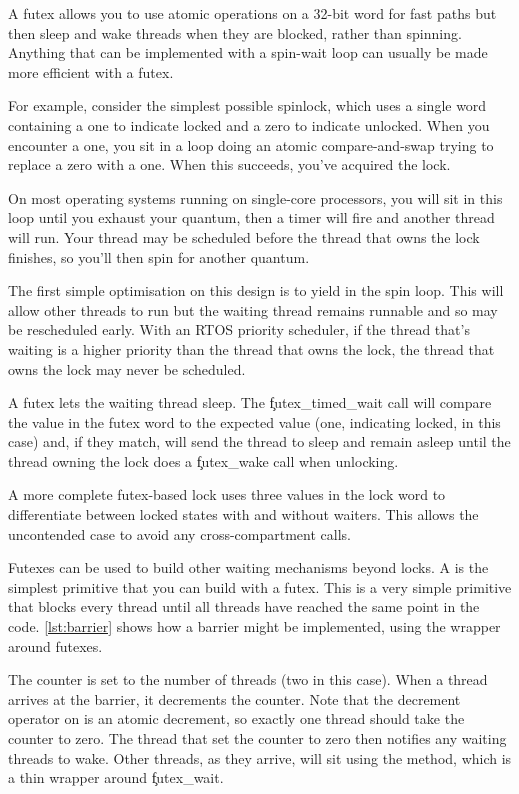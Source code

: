 A futex allows you to use atomic operations on a 32-bit word for fast paths but then sleep and wake threads when they are blocked, rather than spinning.
Anything that can be implemented with a spin-wait loop can usually be made more efficient with a futex.

For example, consider the simplest possible spinlock, which uses a single word containing a one to indicate locked and a zero to indicate unlocked.
When you encounter a one, you sit in a loop doing an atomic compare-and-swap trying to replace a zero with a one.
When this succeeds, you've acquired the lock.

On most operating systems running on single-core processors, you will sit in this loop until you exhaust your quantum, then a timer will fire and another thread will run.
Your thread may be scheduled before the thread that owns the lock finishes, so you'll then spin for another quantum.

The first simple optimisation on this design is to yield in the spin loop.
This will allow other threads to run but the waiting thread remains runnable and so may be rescheduled early.
With an RTOS priority scheduler, if the thread that's waiting is a higher priority than the thread that owns the lock, the thread that owns the lock may never be scheduled.

A futex lets the waiting thread sleep.
The \c{futex_timed_wait} call will compare the value in the futex word to the expected value (one, indicating locked, in this case) and, if they match, will send the thread to sleep and remain asleep until the thread owning the lock does a \c{futex_wake} call when unlocking.

A more complete futex-based lock uses three values in the lock word to differentiate between locked states with and without waiters.
This allows the uncontended case to avoid any cross-compartment calls.

Futexes can be used to build other waiting mechanisms beyond locks.
A  is the simplest primitive that you can build with a futex.
This is a very simple primitive that blocks every thread until all threads have reached the same point in the code.
\ref{lst:barrier} shows how a barrier might be implemented, using the  wrapper around futexes.

\codelisting[filename=examples/barrier/barrier.cc,marker=entry,label=lst:barrier,caption="Implementing a barrier with a futex"]{}

The counter is set to the number of threads (two in this case).
When a thread arrives at the barrier, it decrements the counter.
Note that the decrement operator on  is an atomic decrement, so exactly one thread should take the counter to zero.
The thread that set the counter to zero then notifies any waiting threads to wake.
Other threads, as they arrive, will sit using the  method, which is a thin wrapper around \c{futex_wait}.

